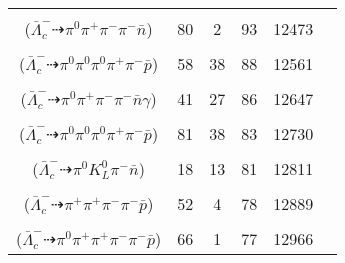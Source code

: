 \documentclass[landscape]{article}
\newcounter{rownumbers}
\newcommand\rn{\stepcounter{rownumbers}\arabic{rownumbers}}
\newcommand{\EOL}{\\} %
\newcommand{\topoTags}[1]{#1} %
\begin{document}
\begin{longtable}{clcccc}
\rn & \makecell[l]{ $ 
\bar{\Lambda}_{c}^{-} \rightarrow \pi^{0} \pi^{-} K^{0} \bar{n} ,
K^{0} \rightarrow K_{S}^{0} ,
K_{S}^{0} \rightarrow \pi^{+} \pi^{-} 
$ \\ ($
\bar{\Lambda}_{c}^{-} \dashrightarrow \pi^{0} \pi^{+} \pi^{-} \pi^{-} \bar{n} 
$) } & \topoTags{80 & 2 & }93 & 12473 \EOL

\rn & \makecell[l]{ $ 
\bar{\Lambda}_{c}^{-} \rightarrow \eta K^{0} \bar{p} ,
\eta \rightarrow \pi^{0} \pi^{0} \pi^{0} ,
K^{0} \rightarrow K_{S}^{0} ,
K_{S}^{0} \rightarrow \pi^{+} \pi^{-} 
$ \\ ($
\bar{\Lambda}_{c}^{-} \dashrightarrow \pi^{0} \pi^{0} \pi^{0} \pi^{+} \pi^{-} \bar{p} 
$) } & \topoTags{58 & 38 & }88 & 12561 \EOL

\rn & \makecell[l]{ $ 
\bar{\Lambda}_{c}^{-} \rightarrow \pi^{+} \pi^{-} \pi^{-} \bar{\Sigma}^{0} ,
\bar{\Sigma}^{0} \rightarrow \bar{\Lambda} \gamma ,
\bar{\Lambda} \rightarrow \pi^{0} \bar{n} 
$ \\ ($
\bar{\Lambda}_{c}^{-} \dashrightarrow \pi^{0} \pi^{+} \pi^{-} \pi^{-} \bar{n} \gamma 
$) } & \topoTags{41 & 27 & }86 & 12647 \EOL

\rn & \makecell[l]{ $ 
\bar{\Lambda}_{c}^{-} \rightarrow \eta \bar{\Sigma}^{*-} ,
\eta \rightarrow \pi^{0} \pi^{0} \pi^{0} ,
\bar{\Sigma}^{*-} \rightarrow \pi^{-} \bar{\Lambda} ,
\bar{\Lambda} \rightarrow \pi^{+} \bar{p} 
$ \\ ($
\bar{\Lambda}_{c}^{-} \dashrightarrow \pi^{0} \pi^{0} \pi^{0} \pi^{+} \pi^{-} \bar{p} 
$) } & \topoTags{81 & 38 & }83 & 12730 \EOL

\rn & \makecell[l]{ $ 
\bar{\Lambda}_{c}^{-} \rightarrow \pi^{0} \pi^{-} K^{0} \bar{n} ,
K^{0} \rightarrow K_{L}^{0} 
$ \\ ($
\bar{\Lambda}_{c}^{-} \dashrightarrow \pi^{0} K_{L}^{0} \pi^{-} \bar{n} 
$) } & \topoTags{18 & 13 & }81 & 12811 \EOL

\rn & \makecell[l]{ $ 
\bar{\Lambda}_{c}^{-} \rightarrow \pi^{+} \pi^{+} \pi^{-} \pi^{-} \bar{p} 
$ \\ ($
\bar{\Lambda}_{c}^{-} \dashrightarrow \pi^{+} \pi^{+} \pi^{-} \pi^{-} \bar{p} 
$) } & \topoTags{52 & 4 & }78 & 12889 \EOL

\rn & \makecell[l]{ $ 
\bar{\Lambda}_{c}^{-} \rightarrow \pi^{+} \pi^{+} \pi^{-} \pi^{-} \bar{\Sigma}^{-} ,
\bar{\Sigma}^{-} \rightarrow \pi^{0} \bar{p} 
$ \\ ($
\bar{\Lambda}_{c}^{-} \dashrightarrow \pi^{0} \pi^{+} \pi^{+} \pi^{-} \pi^{-} \bar{p} 
$) } & \topoTags{66 & 1 & }77 & 12966 \EOL


\end{longtable}
\end{document}
